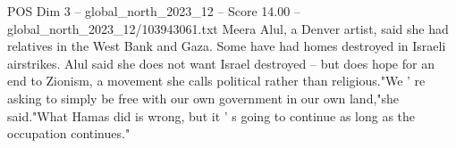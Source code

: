 \begin{textsample}{POS Dim 3 – global\_north\_2023\_12 – Score 14.00 – global\_north\_2023\_12/103943061.txt}
Meera Alul, a Denver artist, said she had relatives in the West Bank and Gaza.
Some have had homes destroyed in Israeli airstrikes.
Alul said she does not want Israel destroyed -- but does hope for an end to Zionism, a movement she calls political rather than religious."We ' re asking to simply be free with our own government in our own land,"she said."What Hamas did is wrong, but it ' s going to continue as long as the occupation continues."

\end{textsample}
